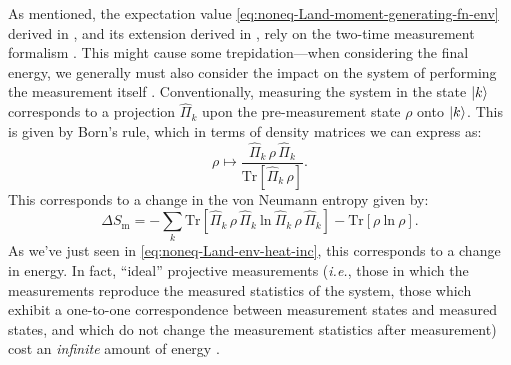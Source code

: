 \documentclass[preprints,article,accept,moreauthors,pdftex]{Definitions/mdpi}
\begin{document}
\begin{paracol}{2}
As mentioned, the expectation value \eqref{eq:noneq-Land-moment-generating-fn-env} derived in \cite{Goold15}, and its extension derived in \cite{GCGPVP17}, rely on the two-time measurement formalism \cite{TLH07}. This might cause some trepidation---when considering the final energy, we generally must also consider the impact on the system of performing the measurement itself \cite{NC00}. Conventionally, measuring the system in the state $\ket{k}$ corresponds \cite{Born26,vN32} to a projection $\widehat{\Pi}_{k}$ upon the pre-measurement state $\rho$ onto $\ket{k}$. This is given by Born's rule, which in terms of density matrices we can express as:
\begin{equation}
    \label{eq:born-rule}
    \rho \mapsto \frac{\widehat{\Pi}_{k}\,\rho\,\widehat{\Pi}_{k}}{\mathrm{Tr}\left[\widehat{\Pi}_{k}\,\rho\right]}.
\end{equation}
This corresponds to a change in the von Neumann entropy given by:
\begin{equation}
    \label{eq:measurement-vN-entropy-change}
    \Delta S_{\mathrm{m}} = -\sum\limits_{k} \mathrm{Tr}\left[\widehat{\Pi}_{k}\,\rho\,\widehat{\Pi}_{k}\:\mathrm{ln}\: \widehat{\Pi}_{k}\,\rho\,\widehat{\Pi}_{k} \right] - \mathrm{Tr}\left[\rho\:\mathrm{ln}\:\rho\right].
\end{equation}
As we've just seen in \eqref{eq:noneq-Land-env-heat-inc}, this corresponds to a change in energy. In fact, ``ideal'' projective measurements (\emph{i.e.}, those in which the measurements reproduce the measured statistics of the system, those which exhibit a one-to-one correspondence between measurement states and measured states, and which do not change the measurement statistics after measurement) cost an \emph{infinite} amount of energy \cite{GFH20}.


\end{paracol}
\end{document}

